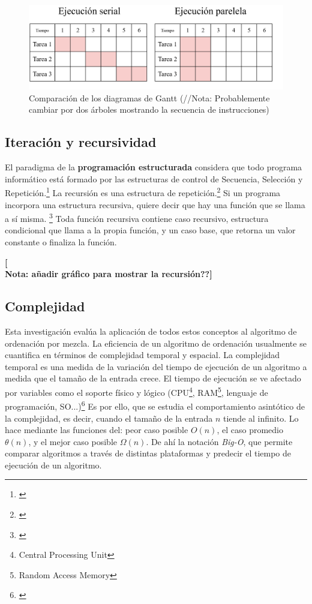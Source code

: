 \documentclass[titlepage]{article}
\begin{document}
\begin{figure}
    \centering
    \includegraphics[width=0.65\linewidth]{Diagrames/serialVsParallel.png}
    \caption{Comparación de los diagramas de Gantt (//Nota: Probablemente cambiar por dos árboles mostrando la secuencia de instrucciones)}
    \label{fig:serialVsParallel}
\end{figure}

\subsection{Iteración y recursividad}
El paradigma de la \textbf{programación estructurada} considera que todo programa informático está formado por las estructuras de control de Secuencia, Selección y Repetición.\footnote{\cite{extended-learning-institute-no-date}} La recursión es una estructura de repetición.\footnote{\cite{wellesley-college-2000}} Si un programa incorpora una estructura recursiva, quiere decir que hay una función que se llama a sí misma. \footnote{\cite{bhargava-2016}} Toda función recursiva contiene caso recursivo, estructura condicional que llama a la propia función, y un caso base,  que retorna un valor constante o finaliza la función. 

\textbf{[\\Nota: añadir gráfico para mostrar la recursión??]}

\subsection{Complejidad}
Esta investigación evalúa la aplicación de todos estos conceptos al algoritmo de ordenación por mezcla. La eficiencia de un algoritmo de ordenación usualmente se cuantifica en términos de complejidad temporal y espacial. La complejidad temporal es una medida de la variación del tiempo de ejecución de un algoritmo a medida que el tamaño de la entrada crece. El tiempo de ejecución se ve afectado por variables como el soporte físico y lógico (CPU\footnote{Central Processing Unit}, RAM\footnote{Random Access Memory}, lenguaje de programación, SO...)\footnote{\cite{Heineman2008-mw}} Es por ello, que se estudia el comportamiento asintótico de la complejidad, es decir, cuando el tamaño de la entrada $n$ tiende al infinito. Lo hace mediante las funciones del: peor caso posible \(O(n)\), el caso promedio \(\theta(n)\), y el mejor caso posible \(\Omega(n)\). \footnotemark[8] De ahí la notación \textit{Big-O}, que permite comparar algoritmos a través de distintas plataformas y predecir el tiempo de ejecución de un algoritmo.
\end{document}
